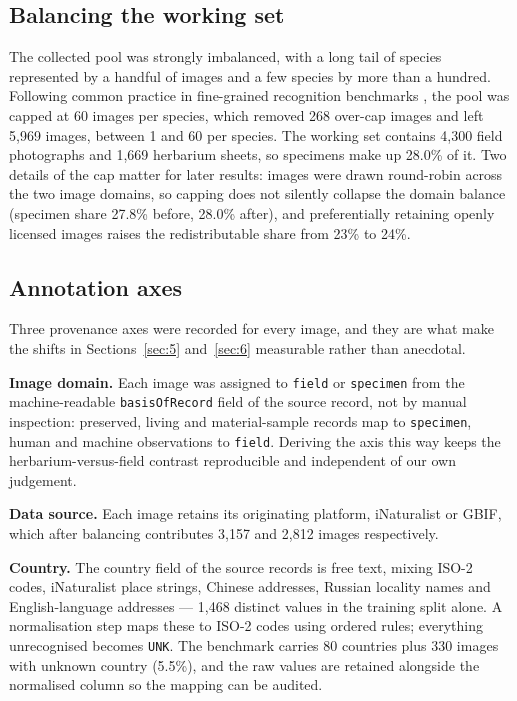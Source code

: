 \documentclass[preprint,12pt,authoryear]{elsarticle}
\begin{document}
\setcounter{section}{3}

\setcounter{subsection}{2}

\subsection{Balancing the working set}\label{sec:3.3}

The collected pool was strongly imbalanced, with a long tail of species represented by a handful of images and a few species by more than a hundred. Following common practice in fine-grained recognition benchmarks \citep{vanhorn2018}, the pool was capped at 60 images per species, which removed 268 over-cap images and left 5,969 images, between 1 and 60 per species. The working set contains 4,300 field photographs and 1,669 herbarium sheets, so specimens make up 28.0\% of it. Two details of the cap matter for later results: images were drawn round-robin across the two image domains, so capping does not silently collapse the domain balance (specimen share 27.8\% before, 28.0\% after), and preferentially retaining openly licensed images raises the redistributable share from 23\% to 24\%.

\setcounter{section}{3}

\setcounter{subsection}{3}

\subsection{Annotation axes}\label{sec:3.4}

Three provenance axes were recorded for every image, and they are what make the shifts in Sections~\ref{sec:5} and~\ref{sec:6} measurable rather than anecdotal.

\textbf{Image domain.} Each image was assigned to \texttt{field} or \texttt{specimen} from the machine-readable \texttt{basisOfRecord} field of the source record, not by manual inspection: preserved, living and material-sample records map to \texttt{specimen}, human and machine observations to \texttt{field}. Deriving the axis this way keeps the herbarium-versus-field contrast reproducible and independent of our own judgement.

\textbf{Data source.} Each image retains its originating platform, iNaturalist or GBIF, which after balancing contributes 3,157 and 2,812 images respectively.

\textbf{Country.} The country field of the source records is free text, mixing ISO-2 codes, iNaturalist place strings, Chinese addresses, Russian locality names and English-language addresses --- 1,468 distinct values in the training split alone. A normalisation step maps these to ISO-2 codes using ordered rules; everything unrecognised becomes \texttt{UNK}. The benchmark carries 80 countries plus 330 images with unknown country (5.5\%), and the raw values are retained alongside the normalised column so the mapping can be audited.
\end{document}
